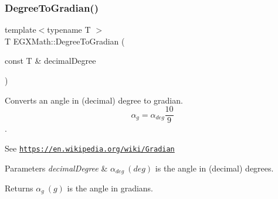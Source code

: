 \subsubsection{\texorpdfstring{Degree\+To\+Gradian()}{DegreeToGradian()}}
{\footnotesize\ttfamily template$<$typename T $>$ \\
T E\+G\+X\+Math\+::\+Degree\+To\+Gradian (\begin{DoxyParamCaption}\item[{const T \&}]{decimal\+Degree }\end{DoxyParamCaption})}



Converts an angle in (decimal) degree to gradian. \[\alpha_{g}=\alpha_{deg}\frac{10}{9}\]. 

See \href{https://en.wikipedia.org/wiki/Gradian}{\tt https\+://en.\+wikipedia.\+org/wiki/\+Gradian} 
\begin{DoxyParams}{Parameters}
{\em decimal\+Degree} & $\alpha_{deg}\ (deg)$ is the angle in (decimal) degrees. \\
\hline
\end{DoxyParams}
\begin{DoxyReturn}{Returns}
$\alpha_{g}\ (g)$ is the angle in gradians. 
\end{DoxyReturn}
